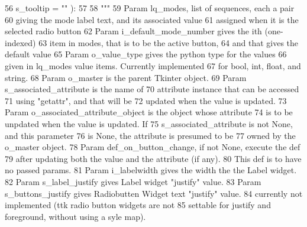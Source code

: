 \begin{DoxyCode}
56             s\_tooltip = \textcolor{stringliteral}{""} ):
57 
58         \textcolor{stringliteral}{"""}
59 \textcolor{stringliteral}{        Param lq\_modes, list of sequences, each a pair}
60 \textcolor{stringliteral}{            giving the mode label text, and its associated value}
61 \textcolor{stringliteral}{            assigned when it is the selected radio button}
62 \textcolor{stringliteral}{        Param i\_default\_mode\_number gives the ith (one-indexed)}
63 \textcolor{stringliteral}{            item in modes, that is to be the active button,}
64 \textcolor{stringliteral}{            and that gives the default value}
65 \textcolor{stringliteral}{        Param o\_value\_type gives the python type for the values}
66 \textcolor{stringliteral}{            given in lq\_modes value items.  Currently implemented}
67 \textcolor{stringliteral}{            for bool, int, float, and string.}
68 \textcolor{stringliteral}{        Param o\_master is the parent Tkinter object.}
69 \textcolor{stringliteral}{                Param s\_associated\_attribute is the name of }
70 \textcolor{stringliteral}{            attribute instance that can be accessed}
71 \textcolor{stringliteral}{            using "getattr", and that will be}
72 \textcolor{stringliteral}{            updated when the value is updated.}
73 \textcolor{stringliteral}{        Param o\_associated\_attribute\_object is the object whose attribute}
74 \textcolor{stringliteral}{            is to be unpdated when the value is updated.  If}
75 \textcolor{stringliteral}{            s\_associated\_attribute is not None, and this parameter}
76 \textcolor{stringliteral}{            is None, the attribute is presumed to be}
77 \textcolor{stringliteral}{            owned by the o\_master object.}
78 \textcolor{stringliteral}{        Param def\_on\_button\_change, if not None, execute the def}
79 \textcolor{stringliteral}{            after updating both the value and the attribute (if any).}
80 \textcolor{stringliteral}{            This def is to have no passed params.}
81 \textcolor{stringliteral}{        Param i\_labelwidth gives the width the the Label widget.}
82 \textcolor{stringliteral}{        Param s\_label\_justify gives Label widget "justify" value.}
83 \textcolor{stringliteral}{        Param s\_buttons\_justify gives Radiobutten Widget text "justify" value.}
84 \textcolor{stringliteral}{                currently not implemented (ttk radio button widgets are not}
85 \textcolor{stringliteral}{                settable for justify and foreground, without using a syle map).}

\end{DoxyCode}
